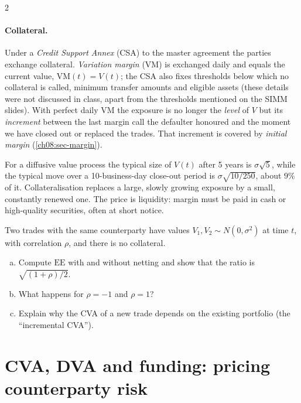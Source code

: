 \begin{paracol}{2}
\paragraph{Collateral.} Under a \emph{Credit Support Annex} (CSA) to the master agreement the parties exchange
collateral. \emph{Variation margin} (VM) is exchanged daily and equals the current value, $\mathrm{VM}(t)=V(t)$;
the CSA also fixes thresholds below which no collateral is called, minimum transfer amounts and eligible assets
(these details were not discussed in class, apart from the thresholds mentioned on the SIMM slides). With perfect
daily VM the exposure is no longer the \emph{level} of $V$ but its \emph{increment} between the last margin call
the defaulter honoured and the moment we have closed out or replaced the trades. That increment is covered by
\emph{initial margin} (\cref{ch08:sec-margin}).

\begin{intuition}
For a diffusive value process the typical size of $V(t)$ after 5 years is $\sigma\sqrt{5}$, while the typical move
over a 10-business-day close-out period is $\sigma\sqrt{10/250}$, about $9\%$ of it. Collateralisation replaces
a large, slowly growing exposure by a small, constantly renewed one. The price is liquidity: margin must be
paid in cash or high-quality securities, often at short notice.
\end{intuition}

\begin{exercise}
Two trades with the same counterparty have values $V_1,V_2\sim N(0,\sigma^2)$ at time $t$, with correlation $\rho$, and
there is no collateral.
\begin{enumerate}[(a)]
  \item Compute $\mathrm{EE}$ with and without netting and show that the ratio is
      $\sqrt{(1+\rho)/2}$.
  \item What happens for $\rho=-1$ and $\rho=1$?
  \item Explain why the CVA of a new trade depends on the
      existing portfolio (the ``incremental CVA'').
\end{enumerate}
\end{exercise}

\section{CVA, DVA and funding: pricing counterparty risk}\label{ch08:sec-cva}


\end{paracol}
